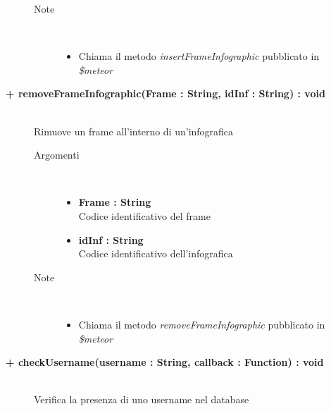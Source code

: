 \begin{description}
\begin{description}
\begin{description}
\begin{itemize}
				\end{itemize}
			\item[Note] \hfill \\
			\begin{itemize}
					\item Chiama il metodo \textit{insertFrameInfographic} pubblicato in \textit{\$meteor}
			\end{itemize}
		\end{description}
	\end{description}
	
	\begin{description}
		\item[\textbf{\color{blue}+ removeFrameInfographic(Frame : String, idInf : String) : void			}] \hfill \\
			Rimuove un frame all'interno di un'infografica
			
		\begin{description}
			\item[Argomenti] \hfill \\
				\begin{itemize}
					\item \textbf{Frame : String			} \hfill \\
					Codice identificativo del frame
					\item \textbf{idInf : String			} \hfill \\
					Codice identificativo dell'infografica
					
				\end{itemize}
			\item[Note] \hfill \\
			\begin{itemize}
					\item Chiama il metodo \textit{removeFrameInfographic} pubblicato in \textit{\$meteor}
			\end{itemize}
		\end{description}
	\end{description}
	
	\begin{description}
		\item[\textbf{\color{blue}+ checkUsername(username : String, callback : Function) : void			}] \hfill \\
			Verifica la presenza di uno username nel database
			

\end{description}
\end{description}

